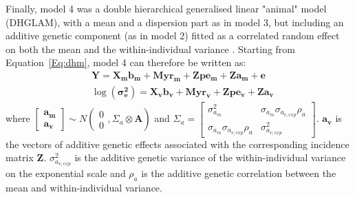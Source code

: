 \documentclass[a4paper,12pt,twoside]{article}
\begin{document}
	Finally, model 4 was a double hierarchical generalised linear "animal" model (DHGLAM), with a mean and a dispersion part as in model 3, but including an additive genetic component (as in model 2) fitted as a correlated random effect on both the mean and the within-individual variance \citep{felleki_estimation_2012}.
	Starting from Equation~\ref{Eq:dhm}, model 4 can therefore be written as:
	\begin{equation}\label{Eq:dham}
		\begin{aligned}
			&\boldsymbol{Y} = \boldsymbol{X_m b_m} + \boldsymbol{M yr_m} + \boldsymbol{Z pe_m} + \boldsymbol{Z a_m} + \boldsymbol{e}\\
			&\log (\boldsymbol{\sigma_e^2}) = \boldsymbol{X_v b_v} + \boldsymbol{M yr_v} + \boldsymbol{Z pe_v} + \boldsymbol{Z a_v}
		\end{aligned}
	\end{equation}
	where 
	$\begin{bmatrix}
		\boldsymbol{a_m} \\
		\boldsymbol{a_v}
	\end{bmatrix}
	\sim N \left(\begin{matrix} 0 \\ 0 \end{matrix}, \Sigma_a \otimes \boldsymbol{A} \right)
	$
	and $\Sigma_a =
	\begin{bmatrix}
		\sigma_{a_m}^2 & \sigma_{a_m}\sigma_{a_{v,exp}}\rho_{a} \\
		\sigma_{a_m}\sigma_{a_{v,exp}}\rho_{a} & \sigma_{a_{v,exp}}^2 
	\end{bmatrix}$.
	$\boldsymbol{a_v}$ is the vectors of additive genetic effects associated with the corresponding incidence matrix $\boldsymbol{Z}$. 
	$\sigma_{a_{v,exp}}^2$ is the additive genetic variance of the within-individual variance on the exponential scale and $\rho_{a}$ is the additive genetic correlation between the mean and within-individual variance.
	
\end{document}
